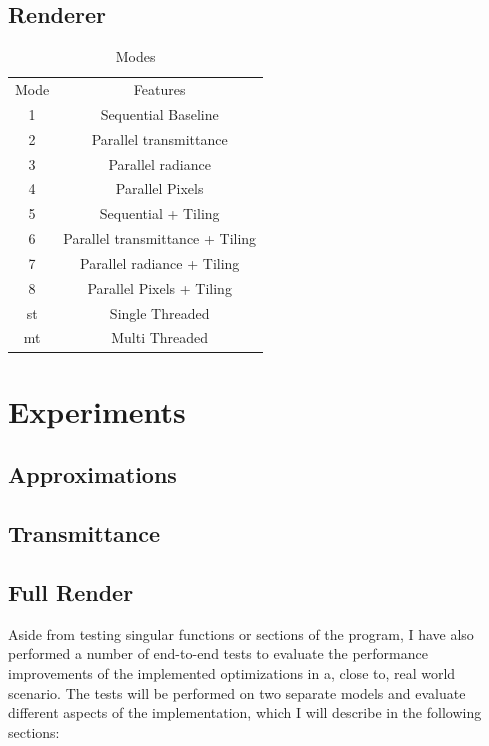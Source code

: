 \documentclass[a4paper, 11pt]{memoir}
\begin{document}
    \section{Renderer}
    \label{sec:renderer}
    \begin{table}[H]
        \centering
        \begin{tabular}{|c|c|}
            \hline
            Mode & Features\\
            1    & Sequential Baseline\\
            2    & Parallel \gls{transmittance}\\
            3    & Parallel \gls{radiance}\\
            4    & Parallel Pixels\\
            5    & Sequential + Tiling\\
            6    & Parallel \gls{transmittance} + Tiling\\
            7    & Parallel \gls{radiance} + Tiling\\
            8    & Parallel Pixels + Tiling\\
            st   & Single Threaded\\
            mt   & Multi Threaded\\
            \hline
        \end{tabular}
        \caption{Modes}
        \label{tab:exec_modes}
    \end{table}
    
    \chapter{Experiments}
    \label{ch:experiments}
    \section{Approximations}
    \section{Transmittance}
    \section{Full Render}
    Aside from testing singular functions or sections of the program, I have also performed a number of end-to-end tests
    to evaluate the performance improvements of the implemented optimizations in a, close to, real world scenario.
    The tests will be performed on two separate models and evaluate different aspects of the implementation,
    which I will describe in the following sections:
\end{document}
